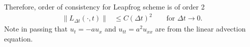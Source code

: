 \documentclass[12pt]{article}
\begin{document}
Therefore, order of consistency for Leapfrog scheme is of order 2
\begin{align*}
	\|L_{\Delta t}(\cdot,t)\| & \leq C (\Delta t)^2\qquad \text{for } \Delta t \to 0.
\end{align*}
Note in passing that $u_{t} = -au_{x}$ and $u_{tt} = a^2u_{xx}$ are from the linear advection equation.
\end{document}
